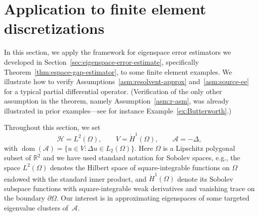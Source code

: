 \documentclass[12pt, oneside, reqno]{amsart}
\theoremstyle{remark}
\DeclareMathOperator{\dom}{dom}
\newcommand{\RR}{\mathbb{R}}
\newcommand{\Ac}{\mathcal{A}}
\newcommand{\Hc}{\mathcal{H}}
\newcommand{\om}{\Omega}
\begin{document}
\section{Application to finite element discretizations} \label{sec:application}


In this section, we apply the framework for eigenspace error
estimators we developed in Section~\ref{sec:eigenspace-error-estimate},
specifically Theorem~\ref{thm:espace-gap-estimator}, to some finite element examples. We illustrate how to verify
Assumptions~\ref{asm:resolvent-approx} and~\ref{asm:source-ee} for a
typical partial differential operator. (Verification of the only other
assumption in the theorem, namely Assumption~\ref{asm:r-asm}, was
already illustrated in prior examples---see for instance 
Example~\ref{ex:Butterworth}.)


Throughout this section, we set
\[
  \Hc = L^2(\Omega), \qquad V = \mathring{H}^1(\Omega), \qquad \Ac = -\Delta,
\]
with $\dom (\Ac)= \{ u \in V: \Delta u \in L_2(\om)\} $.
Here $\om$ is a Lipschitz polygonal subset of $\RR^2$ and we have used
standard notation for Sobolev spaces, e.g., the space $L^2(\om)$
denotes the Hilbert space of square-integrable functions on \(\Omega\)
endowed with the standard inner product, and
\(\mathring{H}^1(\Omega)\) denote its Sobolev subspace functions with
square-integrable weak derivatives and vanishing trace on the boundary
\(\partial \Omega\).  Our interest is in approximating eigenspaces of
some targeted eigenvalue clusters of~$\Ac$.
\end{document}
